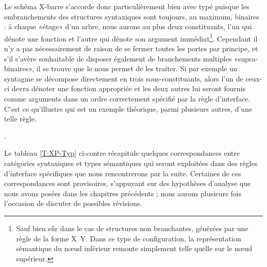 Le schéma X-barre s'accorde donc particulièrement bien avec {\LO} typé puisque les embranchements des structures syntaxiques sont toujours, au maximum, binaires : à chaque «étage» d'un arbre, nous aurons au plus deux constituants, l'un  qui dénote une fonction et l'autre qui dénote son argument immédiat{\footnote{Sauf bien sûr dans le cas de structures non branchantes, générées par une règle de la forme \mbox{X {\reecr} Y}.  Dans ce type de configuration, la représentation sémantique du n\oe ud inférieur remonte simplement telle quelle sur le n\oe ud supérieur.}}.
Cependant il n'y a pas nécessairement de raison de se fermer toutes les portes par principe, et s'il s'avère souhaitable de disposer également de branchements multiples «supra-binaires», il se trouve que le {\lcalcul} nous permet de les traiter. 
Si par exemple un syntagme se décompose directement en trois sous-constituants, alors l'un de ceux-ci devra dénoter une fonction appropriée et les deux autres lui seront fournis comme arguments dans un ordre correctement spécifié par la règle d'interface. 
C'est ce qu'illustre {\Next} qui est un exemple théorique, parmi plusieurs autres, d'une telle règle. 


\ex. \label{xRI1tr}
%



Le tableau \ref{T:XP-Typ} ci-contre récapitule quelques  correspondances entre catégories syntaxiques et types sémantiques qui seront exploitées dans des règles d'interface spécifiques que nous rencontrerons par la suite.  Certaines de ces correspondances sont provisoires, s'appuyant sur des hypothèses d'analyse que nous avons posées dans les chapitres précédents ; nous aurons plusieurs fois l'occasion de discuter de possibles révisions.

